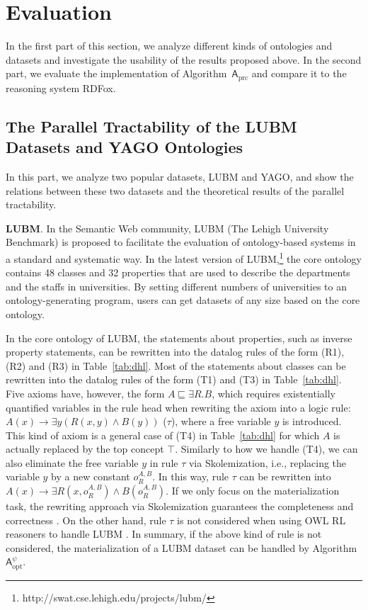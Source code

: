\section{Evaluation}
\label{sec:evaluation}

In the first part of this section, we analyze different kinds of ontologies and datasets
and investigate the usability of the results proposed above.
In the second part, we evaluate the implementation of Algorithm~$\mathsf{A}_{\text{prc}}$
and compare it to the reasoning system RDFox.

\subsection{The Parallel Tractability of the LUBM Datasets and YAGO Ontologies}

In this part, we analyze two popular datasets, LUBM and YAGO, and show the relations
between these two datasets and the theoretical results of the parallel tractability.

\textbf{LUBM}. In the Semantic Web community, LUBM
(The Lehigh University Benchmark) is proposed to
facilitate the evaluation of ontology-based systems
in a standard and systematic way.
In the latest version of LUBM,\footnote{http://swat.cse.lehigh.edu/projects/lubm/}
the core ontology contains 48 classes and 32 properties
that are used to describe the departments and the staffs in
universities. By setting different numbers of universities to an ontology-generating
program, users can get datasets of any size based on the core ontology.

In the core ontology of LUBM, the statements about properties, such as inverse property statements,
can be rewritten into the datalog rules of the form (R1), (R2) and (R3) in Table~\ref{tab:dhl}.
Most of the statements about classes can be rewritten into the datalog rules of the form (T1) and (T3)
in Table~\ref{tab:dhl}. Five axioms have, however, the form $A\sqsubseteq\exists R.B$,
which requires existentially quantified variables in the rule head when rewriting
the axiom into a logic rule: $A(x)\rightarrow\exists y(R(x,y)\wedge B(y))$ ($\tau$),
where a free variable $y$ is introduced. This kind of axiom is a general case of (T4) in Table~\ref{tab:dhl}
for which $A$ is actually replaced by the top concept $\top$.
Similarly to how we handle (T4), we can also eliminate the free variable $y$
in rule $\tau$ via Skolemization, i.e., replacing the variable $y$ by a new constant $o_R^{A,B}$.
In this way, rule $\tau$ can be rewritten into $A(x)\rightarrow\exists R(x,o_R^{A,B})\wedge B(o_R^{A,B})$.
If we only focus on the materialization task, the rewriting approach via Skolemization guarantees the
completeness and correctness \cite{GrauHKKMMW13}.
On the other hand, rule $\tau$ is not considered when using OWL RL reasoners to handle LUBM \cite{UrbaniKMHB12,WeaverH09}.
In summary, if the above kind of rule is not considered,
the materialization of a LUBM dataset can be handled by Algorithm~$\mathsf{A}_{\text{opt}}^{\psi}$.

